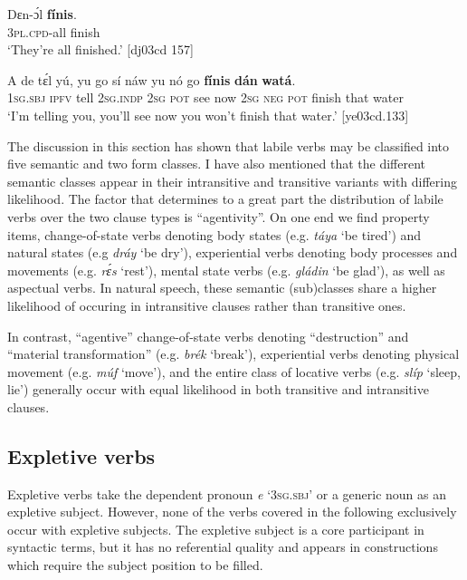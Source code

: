 \ea%
    \label{ex:key:1131}
    \gll Dɛn-ɔ́l      \textbf{fínis}.\\
\textsc{3pl}.\textsc{cpd}{}-all  finish\\
\glt ‘They’re all finished.’ [dj03cd 157]
\z


\ea%
    \label{ex:key:1132}
    \gll A    de  tɛ́l  yú,    yu  go  sí  náw  
yu  nó  go  \textbf{fínis}  \textbf{dán}    \textbf{watá}.\\
\textsc{1sg.sbj}  \textsc{ipfv}  tell  \textsc{2sg.indp}  \textsc{2sg}  \textsc{pot}  see  now  
\textsc{2sg}  \textsc{neg}  \textsc{pot}  finish  that    water\\

\glt ‘I’m telling you, you’ll see now you won’t finish that water.’ [ye03cd.133]
\z

The discussion in this section has shown that labile verbs may be classified into five semantic and two form classes. I have also mentioned that the different semantic classes appear in their intransitive and transitive variants with differing likelihood. The factor that determines to a great part the distribution of labile verbs over the two clause types is “agentivity”{\fff}. On one end we find property items, change-of-state verbs denoting body state{\fff}s (e.g. \textit{táya} ‘be tired’) and natural states (e.g \textit{dráy} ‘be dry’), experiential verbs denoting body processes and movements (e.g. \textit{rɛ́s} ‘rest’), mental state verbs (e.g. \textit{gládin} ‘be glad’), as well as aspectual verbs. In natural speech, these semantic (sub)classes share a higher likelihood of occuring in intransitive clauses rather than transitive ones. 


In contrast, “agentive” change-of-state verbs denoting “destruction” and “material transformation” (e.g. \textit{brék} ‘break’), experiential verbs denoting physical movement (e.g. \textit{múf} ‘move’), and the entire class of locative verbs (e.g. \textit{slíp} ‘sleep, lie’) generally occur with equal likelihood in both transitive and intransitive clauses.


\subsection{Expletive verbs}\label{sec:9.2.4}

Expletive verbs take the dependent pronoun \textit{e} ‘\textsc{3sg.sbj}’ or a generic noun as an expletive subject. However, none of the verbs covered in the following exclusively occur with expletive subjects. The expletive subject is a core participant in syntactic terms, but it has no referential quality and appears in constructions which require the subject position to be filled. 


